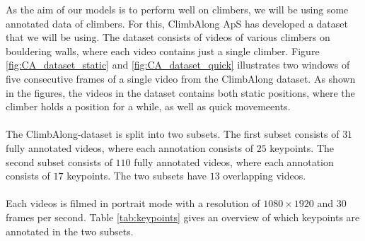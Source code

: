 \documentclass[./main.tex]{subfiles}
\begin{document}
As the aim of our models is to perform well on climbers, we will be using some annotated data of climbers. For this, ClimbAlong ApS has developed a dataset that we will be using. The dataset consists of videos of various climbers on bouldering walls, where each video contains just a single climber. Figure \ref{fig:CA_dataset_static} and \ref{fig:CA_dataset_quick} illustrates two windows of five consecutive frames of a single video from the ClimbAlong dataset. As shown in the figures, the videos in the dataset contains both static positions, where the climber holds a position for a while, as well as quick movemeents.
\\
\\
The ClimbAlong-dataset is split into two subsets. The first subset consists of $31$ fully annotated videos, where each annotation consists of $25$ keypoints. The second subset consists of $110$ fully annotated videos, where each annotation consists of $17$ keypoints. The two subsets have $13$ overlapping videos.
\\
\\
Each videos is filmed in portrait mode with a resolution of $1080 \times 1920$ and $30$ frames per second. Table \ref{tab:keypoints} gives an overview of which keypoints are annotated in the two subsets. 
\end{document}
